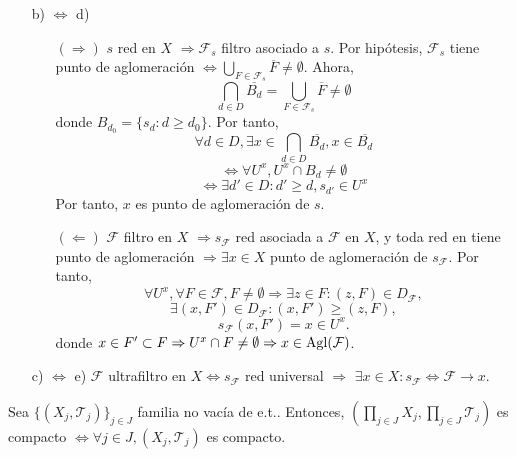 \begin{dem}
\begin{enumerate}[label=(\roman*)]
    \item [b) $\Leftrightarrow$ d)] 
      \begin{enumerate}[label=(\roman*)]
        \item []
        \item [$(\Rightarrow)$] $s$ red en $X$ $\Rightarrow \mathcal{F}_{s}$ filtro asociado a $s$. Por hipótesis, $\mathcal{F}_{s}$ tiene punto de aglomeración $\Leftrightarrow \bigcup_{F \in \mathcal{F}_{s}} \overline{F} \neq \emptyset$. Ahora,
          \[ 
            \bigcap_{d \in D} \overline{B_{d}} =  \bigcup_{F \in \mathcal{F}_{s}} \overline{F} \neq \emptyset
          \] 
          donde $B_{d_{0}} = \{ s_{d} : d \geq d_{0} \}$. Por tanto,
          \[
            \forall d \in D, \exists x \in \bigcap_{d \in D} \overline{B_{d}}, x \in \overline{B_{d}}
          \]
          \[ 
            \Leftrightarrow \forall U^{x}, U^{x} \cap B_{d} \neq \emptyset 
          \] 
          \[ 
            \Leftrightarrow  \exists d' \in D : d' \geq d , s_{d'} \in U^{x}
          \] 
          Por tanto, $x$ es punto de aglomeración de $s$.
        \item [$(\Leftarrow)$] $\mathcal{F}$ filtro en $X$ $\Rightarrow s_{\mathcal{F}} $ red asociada a $\mathcal{F}$ en $X$, y toda red en tiene punto de aglomeración $\Rightarrow \exists x \in X$ punto de aglomeración de $s_{\mathcal{F}}$. Por tanto,
          \[
            \forall U^{x}, \forall F \in \mathcal{F}, F \neq \emptyset \Rightarrow \exists z \in F: (z, F) \in D_{\mathcal{F}},
          \]
          \[ 
            \exists (x, F') \in D_{\mathcal{F}}: (x,F') \geq (z, F), 
          \] 
          \[ 
            s_{\mathcal{F}}(x, F') = x \in U^{x}. 
          \] 
          donde $x \in F' \subset F \Rightarrow U^{x} \cap F \neq \emptyset \Rightarrow x \in \operatorname{Agl}(\mathcal{F})$.

      \end{enumerate}
    \item [c) $\Leftrightarrow$ e)] $\mathcal{F}$ ultrafiltro en $X \Leftrightarrow s_{\mathcal{F}}$ red universal $\Rightarrow$ $\exists x \in X : s_{\mathcal{F}} \Leftrightarrow \mathcal{F} \rightarrow x$.
  \end{enumerate}
\end{dem}

\begin{theo}[Tychonoff]
  Sea $\{ ( X_{j}, \mathcal{T}_{j} ) \}_{j \in J}$ familia no vacía de e.t.. Entonces, $( \prod_{j \in J} X_{j}, \prod_{j \in J} \mathcal{T}_{j} )$ es compacto $\Leftrightarrow \forall j \in J, ( X_{j}, \mathcal{T}_{j} )$ es compacto.
\end{theo}


